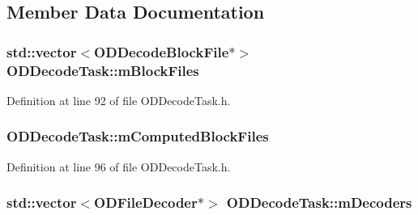 \subsection{Member Data Documentation}
\subsubsection[{\texorpdfstring{m\+Block\+Files}{mBlockFiles}}]{\setlength{\rightskip}{0pt plus 5cm}std\+::vector$<${\bf O\+D\+Decode\+Block\+File}$\ast$$>$ O\+D\+Decode\+Task\+::m\+Block\+Files\hspace{0.3cm}{\ttfamily [protected]}}\hypertarget{class_o_d_decode_task_a920d4e6297a7996e6e5a8529e98167ee}{}\label{class_o_d_decode_task_a920d4e6297a7996e6e5a8529e98167ee}


Definition at line 92 of file O\+D\+Decode\+Task.\+h.

\subsubsection[{\texorpdfstring{m\+Computed\+Block\+Files}{mComputedBlockFiles}}]{ O\+D\+Decode\+Task\+::m\+Computed\+Block\+Files\hspace{0.3cm}{\ttfamily [protected]}}\hypertarget{class_o_d_decode_task_a46c66f8053205cb4791b36d5f692a83e}{}\label{class_o_d_decode_task_a46c66f8053205cb4791b36d5f692a83e}


Definition at line 96 of file O\+D\+Decode\+Task.\+h.

\subsubsection[{\texorpdfstring{m\+Decoders}{mDecoders}}]{\setlength{\rightskip}{0pt plus 5cm}std\+::vector$<${\bf O\+D\+File\+Decoder}$\ast$$>$ O\+D\+Decode\+Task\+::m\+Decoders\hspace{0.3cm}{\ttfamily [protected]}}\hypertarget{class_o_d_decode_task_a1bf85af941ecc998eae165c44cf32c71}{}\label{class_o_d_decode_task_a1bf85af941ecc998eae165c44cf32c71}


